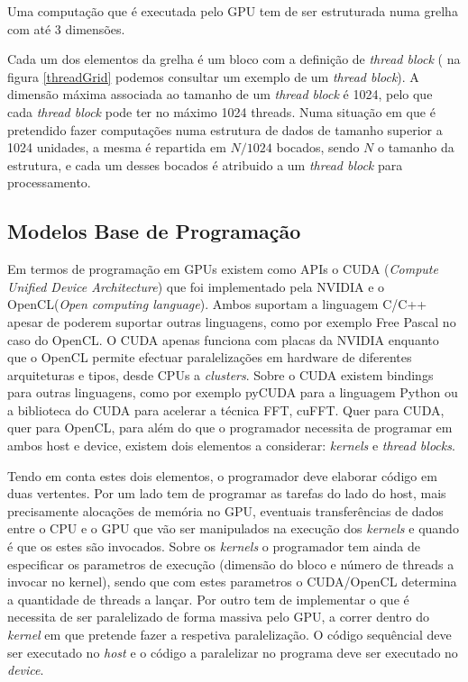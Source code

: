 Uma computação que é executada pelo GPU tem de ser estruturada numa grelha com até 3 dimensões. \par Cada um dos elementos da grelha é um bloco com a definição de \textit{thread block} ( na figura \ref{threadGrid} podemos consultar um exemplo de um \textit{thread block}). A dimensão máxima associada ao tamanho de um \textit{thread block} é 1024, pelo que cada  \textit{thread block} pode ter no máximo 1024 threads. Numa situação em que é pretendido fazer computações numa estrutura de dados de tamanho superior a 1024 unidades, a mesma é repartida em $N/1024$ bocados, sendo $N$ o tamanho da estrutura, e cada um desses bocados é atribuido a um \textit{thread block} para processamento. 
 
\subsection{Modelos Base de Programação} 
\label{progGPU}
Em termos de programação em GPUs existem como APIs o CUDA (\textit{Compute Unified Device Architecture})\cite{cudaZone} que foi implementado pela NVIDIA e o OpenCL(\textit{Open computing language})\cite{openCL}. Ambos suportam a linguagem C/C++ apesar de poderem suportar outras linguagens, como por exemplo Free Pascal no caso do OpenCL. O CUDA apenas funciona com placas da NVIDIA enquanto que o OpenCL permite efectuar paralelizações em hardware de diferentes arquiteturas e tipos, desde CPUs a \textit{clusters}. Sobre o CUDA existem bindings para outras linguagens, como por exemplo pyCUDA para a linguagem Python ou a biblioteca do CUDA para acelerar a técnica FFT, cuFFT\cite{nvidiaFFT}. Quer para CUDA, quer para OpenCL, para além do que o programador necessita de programar em ambos host e device,  existem dois elementos a considerar: \textit{kernels} e \textit{thread blocks}. 

Tendo em conta estes dois elementos, o programador deve elaborar código em duas vertentes. Por um lado tem de programar as tarefas do lado do host, mais precisamente alocações de memória no GPU, eventuais transferências de dados entre o CPU e o GPU que vão ser manipulados na execução dos \textit{kernels} e quando é que os estes são invocados. Sobre os \textit{kernels} o programador tem ainda de especificar os parametros de execução (dimensão do bloco e número de threads a invocar no kernel), sendo que com estes parametros o CUDA/OpenCL determina a quantidade de threads a lançar. Por outro tem de implementar o que é necessita de ser paralelizado de forma massiva pelo GPU, a correr dentro do \textit{kernel} em que pretende fazer a respetiva paralelização. O código sequêncial deve ser executado no \textit{host} e o código a paralelizar no programa deve ser executado no \textit{device}.


